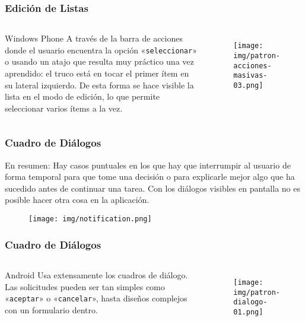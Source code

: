 \documentclass{beamer}
\begin{document}
\begin{frame}
\frametitle{Edición de Listas}

\begin{columns}[c] %

\begin{block}{Windows Phone}
\justify
A través de la barra de acciones donde el usuario encuentra la opción «\texttt{seleccionar}» o usando un atajo que resulta muy práctico una vez aprendido: el truco está en tocar el primer ítem en su lateral izquierdo. De esta forma se hace visible la lista en el modo de edición, lo que permite seleccionar varios ítems a la vez.
\end{block}

\begin{figure}[H]
  \centering
  \texttt{[image: img/patron-acciones-masivas-03.png]}
\end{figure}
\end{columns}
\end{frame}


\begin{frame}
\frametitle{Cuadro de Diálogos}

\begin{block}{En resumen:}
\justify
Hay casos puntuales en los que hay que interrumpir al usuario de forma temporal para que tome una decisión o para explicarle mejor algo que ha sucedido antes de continuar una tarea. Con los diálogos visibles en pantalla no es posible hacer otra cosa en la aplicación.
\end{block}

\begin{figure}[H]
  \centering
  \texttt{[image: img/notification.png]}
\end{figure}
\end{frame}


\begin{frame}
\frametitle{Cuadro de Diálogos}

\begin{columns}[c] %

\justify
\begin{block}{Android}
Usa extensamente los cuadros de diálogo. Las solicitudes pueden ser tan simples como «\texttt{aceptar}» o «\texttt{cancelar}», hasta diseños complejos con un formulario dentro.
\end{block}

\begin{figure}[H]
  \centering
  \texttt{[image: img/patron-dialogo-01.png]}
\end{figure}
\end{columns}
\end{frame}
\end{document}
